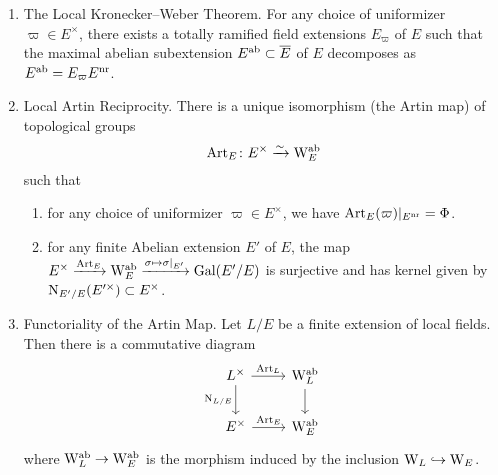 \documentclass[../main.tex]{subfiles}
\begin{document}
\begin{thm}\label{thm:LocalKroneckerWeber} \leavevmode
  \vspace{-0.5em}
  \begin{enumerate}
    \item \textnormal{The Local Kronecker--Weber Theorem.} For any choice of
      uniformizer $\varpi \in E^\times$, there exists a 
      totally ramified field extensions $E_\varpi$ of $E$ such that 
      the maximal abelian subextension $E^{\mathrm{ab}} \subset \overline E$ of $E$
      decomposes as $E^{\mathrm{ab}} = E_\varpi E^{\mathrm{nr}}$.     
    \item \textnormal{Local Artin Reciprocity.} There is a unique isomorphism
      (the Artin map) of topological groups
      \begin{equation*}
        \operatorname{Art}_E\colon E^\times \xrightarrow{\sim} \mathrm W_E^{\mathrm{ab}}
      \end{equation*}
      such that 
      \begin{enumerate}
        \item for any choice of uniformizer $\varpi \in E^\times$, we have
          $\operatorname{Art}_E(\varpi)|_{E^{\mathrm{nr}}} = \Phi$.
        \item for any finite Abelian extension $E'$ of $E$, the
          map $E^\times \xrightarrow{\operatorname{Art}_E} \mathrm W_E^{\mathrm{ab}} \xrightarrow{\sigma \mapsto
          \sigma|_{E'}} \operatorname{Gal}(E'/E)$ is surjective and has kernel given by
          $\operatorname{N}_{E'/E}(E'^\times) \subset E^\times$. 
      \end{enumerate}
    \item \textnormal{Functoriality of the Artin Map.}
        Let $L/E$ be a finite extension of local fields. Then there is a
        commutative diagram
        \begin{equation*}
        \begin{tikzcd}[ampersand replacement=\&]
        	{L^\times} \& {\Weil_L^\ab} \\
        	{E^\times} \& {\Weil_E^\ab}
        	\arrow["{\Art_L}", from=1-1, to=1-2]
        	\arrow["{\Norm_{L/E}}"', from=1-1, to=2-1]
          \arrow[from=1-2, to=2-2]
        	\arrow["{\Art_E}", from=2-1, to=2-2]
        \end{tikzcd}
        \end{equation*}
        where $\mathrm W_L^{\mathrm{ab}} \to \mathrm W_E^{\mathrm{ab}}$ is the morphism induced by the
        inclusion $\mathrm W_L \hookrightarrow \mathrm W_E$.
  \end{enumerate}
\end{thm}
\end{document}
